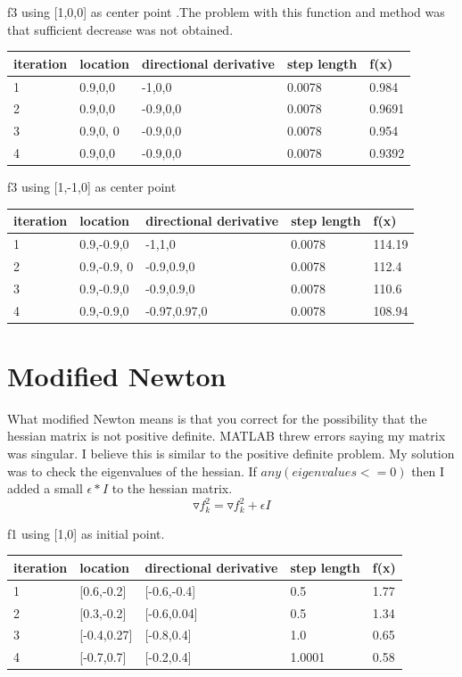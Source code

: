 \documentclass[7pt]{article}
\begin{document}
					f3 using [1,0,0] as center point .The problem with this function and method was that sufficient decrease was not obtained.
		\begin{center}
			\begin{tabular}{ | l | l | l | l | l |}
				\hline
				iteration & location & directional derivative & step length & f(x) \\ \hline
				1& 0.9,0,0  & -1,0,0  & 0.0078 & 0.984\\ \hline
				2& 0.9,0,0  & -0.9,0,0 & 0.0078 & 0.9691\\ \hline
				3& 0.9,0, 0 & -0.9,0,0 & 0.0078 & 0.954\\ \hline
				4& 0.9,0,0 & -0.9,0,0 & 0.0078 & 0.9392\\
				\hline
			\end{tabular}
		\end{center}
		
		f3 using [1,-1,0] as center point 
	\begin{center}
		\begin{tabular}{ | l | l | l | l | l |}
			\hline
			iteration & location & directional derivative & step length & f(x) \\ \hline
			1& 0.9,-0.9,0 & -1,1,0 & 0.0078 & 114.19\\ \hline
			2& 0.9,-0.9, 0& -0.9,0.9,0  & 0.0078  & 112.4\\ \hline
			3& 0.9,-0.9,0 & -0.9,0.9,0  & 0.0078  & 110.6\\ \hline
			4& 0.9,-0.9,0 & -0.97,0.97,0 & 0.0078 & 108.94\\
			\hline
		\end{tabular}
	\end{center}
			
		
	\section{Modified Newton}
	What modified Newton means is that you correct for the possibility that the hessian matrix is not positive definite. MATLAB threw errors saying my matrix was singular. I believe this is similar to the positive definite problem. My solution was to check the eigenvalues of the hessian. If $any( eigen values <= 0)$ then I added a small $\epsilon * I$ to the hessian matrix. 
	$$ \triangledown f_k^2 = \triangledown f_k^2 + \epsilon I $$
	
	f1 using [1,0] as initial point. 
		\begin{center}
			\begin{tabular}{ | l | l | l | l | l |}
				\hline
				iteration & location & directional derivative & step length & f(x) \\ \hline
				1& [0.6,-0.2] & [-0.6,-0.4]  & 0.5 & 1.77\\ \hline
				2&  [0.3,-0.2]&[-0.6,0.04]  & 0.5 & 1.34\\ \hline
				3& [-0.4,0.27] & [-0.8,0.4]  & 1.0 & 0.65\\ \hline
				4& [-0.7,0.7] & [-0.2,0.4] & 1.0001 & 0.58\\
				\hline
			\end{tabular}
		\end{center}
		
\end{document}

